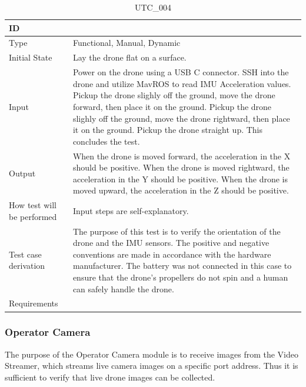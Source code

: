 \documentclass[12pt, titlepage]{article}
\begin{document}
\begin{table}[!h]
\begin{center}
\caption {UTC\_004}
\label{tab:UTC_004}
\begin{tabular}{ | m{3.2cm} | m{12.2cm} | } 
\hline
ID & \nameref{tab:UTC_004} \\ 
\hline
Type &  Functional, Manual, Dynamic  \\ 
\hline
Initial State & Lay the drone flat on a surface.\\ 
\hline
Input & Power on the drone using a USB C connector. SSH into the drone and utilize MavROS to read IMU Acceleration values. Pickup the drone slighly off the ground, move the drone forward, then place it on the ground. Pickup the drone slighly off the ground, move the drone rightward, then place it on the ground. Pickup the drone straight up. This concludes the test.\\ 
\hline
Output &  When the drone is moved forward, the acceleration in the X should be positive. When the drone is moved rightward, the acceleration in the Y should be positive. When the drone is moved upward, the acceleration in the Z should be positive.\\ 
\hline
How test will be performed & Input steps are self-explanatory.  \\ 
\hline
Test case derivation & The purpose of this test is to verify the orientation of the drone and the IMU sensors. The positive and negative conventions are made in accordance with the hardware manufacturer. The battery was not connected in this case to ensure that the drone's propellers do not spin and a human can safely handle the drone. \\ 
\hline
Requirements &  \\ 
\hline
\end{tabular}
\end{center}
\end{table}

\clearpage

\subsubsection{Operator Camera}

The purpose of the Operator Camera module is to receive images from the Video Streamer, which streams live camera images on a specific port address. Thus it is sufficient to verify that live drone images can be collected.
\end{document}
